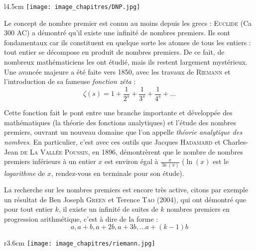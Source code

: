 
\begin{His}

{\color{brown}{\large Les nombres premiers}}

\medskip
\begin{wrapfigure}[15]{l}{4.5cm}
\vspace{-7mm}
\texttt{[image: image\_chapitres/DNP.jpg]} 
\end{wrapfigure}

Le concept de nombre premier est connu au moins depuis les grecs : 
\textsc{Euclide} (Ca 300 AC) a démontré qu'il existe
une infinité de nombres premiers. Ils sont fondamentaux car
ils constituent en quelque sorte les atomes de tous les entiers : 
tout entier se décompose en produit de nombres premiers. De ce
fait, de nombreux mathématiciens les ont étudié, mais ils
restent largement mystérieux. Une avancée majeure a été faite
vers 1850, avec les travaux de \textsc{Riemann} et l'introduction de sa
fameuse {\em fonction zêta} :
\[ \zeta(s)=1+\frac{1}{2^s}+\frac{1}{3^s}+\frac{1}{4^s}+ \ldots
\]

Cette fonction fait le pont entre une branche importante et
développée des mathématiques (la théorie des fonctions analytiques)
et l'étude des nombres premiers, ouvrant un nouveau domaine que l'on 
appelle {\em théorie analytique des nombres}. En particulier, 
c'est avec ces outils que  Jacques \textsc{Hadamard} et 
Charles-Jean \textsc{de La Vallée Poussin}, en 1896, démontrèrent
que le nombre de nombres premiers inférieurs à un entier $x$ est environ
égal à $\displaystyle\frac{x}{\ln(x)}$ ($\ln(x)$ est le {\em logarithme} de $x$,
rendez-vous en terminale pour son étude). 



La recherche sur les nombres premiers est encore très active, citons
par exemple un résultat de 
Ben Joseph \textsc{Green} et Terence \textsc{Tao} (2004),
qui ont démontré que
pour tout entier $k$, il existe un infinité de suites de $k$ nombres
premiers 
en progression arithmétique, c'est à dire de la forme :
\[ a, a+b ,a+2b, a+3b, ... a+(k-1)b \]

\vspace{0.4cm}
\begin{wrapfigure}[10]{r}{3.6cm}
\vspace{-7mm}
\texttt{[image: image\_chapitres/riemann.jpg]}
\end{wrapfigure}


\end{His}
